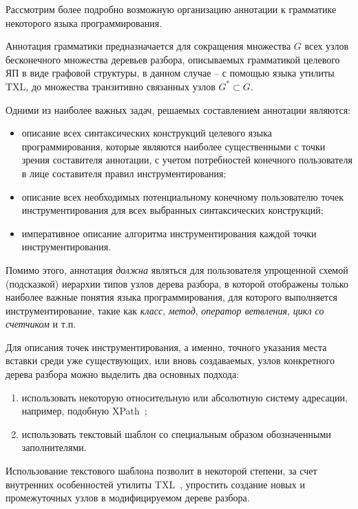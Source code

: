 Рассмотрим более подробно возможную организацию аннотации к грамматике некоторого языка программирования.

Аннотация грамматики предназначается для сокращения множества $G$ всех узлов бесконечного множества деревьев разбора, описываемых грамматикой целевого ЯП в виде графовой структуры, в данном случае -- с помощью языка утилиты TXL, до множества транзитивно связанных узлов $G^* \subset G$.

Одними из наиболее важных задач, решаемых составлением аннотации являются:

\begin{itemize}[noitemsep]
  \item описание всех синтаксических конструкций целевого языка программирования, которые являются наиболее существенными с точки зрения составителя аннотации, с учетом потребностей конечного пользователя в лице составителя правил инструментирования;
  \item описание всех необходимых потенциальному конечному пользователю точек инструментирования для всех выбранных синтаксических конструкций;
  \item императивное описание алгоритма инструментирования каждой точки инструментирования.
\end{itemize}

Помимо этого, аннотация \textit{должна} являться для пользователя упрощенной схемой (подсказкой) иерархии типов узлов дерева разбора, в которой отображены только наиболее важные понятия языка программирования, для которого выполняется инструментирование, такие как \textit{класс}, \textit{метод}, \textit{оператор ветвления}, \textit{цикл со счетчиком} и т.п.

Для описания точек инструментирования, а именно, точного указания места вставки среди уже существующих, или вновь создаваемых, узлов конкретного дерева разбора можно выделить два основных подхода:

\begin{enumerate}[noitemsep]
  \item использовать некоторую относительную или абсолютную систему адресации, например, подобную XPath~\cite{xpath};
  \item использовать текстовый шаблон со специальным образом обозначенными заполнителями.
\end{enumerate}

Использование текстового шаблона позволит в некоторой степени, за счет внутренних особенностей утилиты TXL~\cite{txl-book}, упростить создание новых и промежуточных узлов в модифицируемом дереве разбора.


